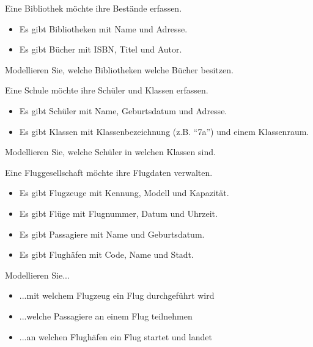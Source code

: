\documentclass[11pt, a4paper, oneside]{article}
\begin{document}
	\pagebreak
	
	
	Eine Bibliothek möchte ihre Bestände erfassen.
	\begin{itemize}
		\item Es gibt Bibliotheken mit Name und Adresse.
		\item Es gibt Bücher mit ISBN, Titel und Autor.
	\end{itemize}
	Modellieren Sie, welche Bibliotheken welche Bücher besitzen.
	
	\boxarea[6cm]
	
	
	Eine Schule möchte ihre Schüler und Klassen erfassen.
	\begin{itemize}
		\item Es gibt Schüler mit Name, Geburtsdatum und Adresse.
		\item Es gibt Klassen mit Klassenbezeichnung (z.B. ``7a'') und einem Klassenraum.
	\end{itemize}
	Modellieren Sie, welche Schüler in welchen Klassen sind.
	
	\boxarea[6cm]
	
	\pagebreak
	
	
	Eine Fluggesellschaft möchte ihre Flugdaten verwalten.
	\begin{itemize}
		\item Es gibt Flugzeuge mit Kennung, Modell und Kapazität.
		\item Es gibt Flüge mit Flugnummer, Datum und Uhrzeit.
		\item Es gibt Passagiere mit Name und Geburtsdatum.
		\item Es gibt Flughäfen mit Code, Name und Stadt.
	\end{itemize}
	Modellieren Sie...
	\begin{itemize}
		\item ...mit welchem Flugzeug ein Flug durchgeführt wird
		\item ...welche Passagiere an einem Flug teilnehmen
		\item ...an welchen Flughäfen ein Flug startet und landet
	\end{itemize}
	
	\boxarea[10cm]
	
	\pagebreak
	
	
\end{document}
